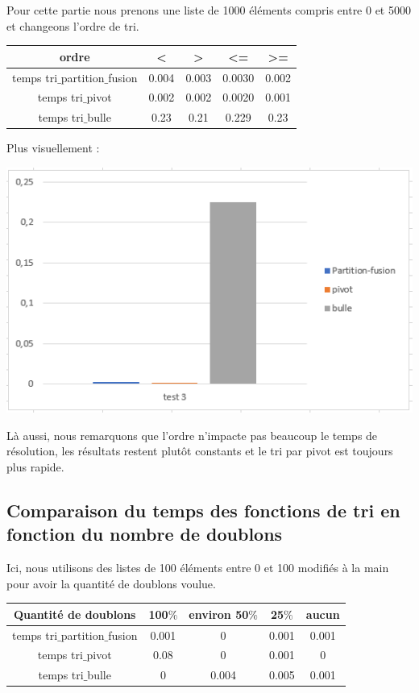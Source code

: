 \documentclass[a4paper, 12pt]{article}
\begin{document}
Pour cette partie nous prenons une liste de 1000 éléments compris entre 0 et 5000 et changeons l'ordre de tri. 
\begin{center}
\begin{tabular}{|c|c|c|c|c|}
\hline 
ordre & < & > & <= & >= \\ 
\hline 
temps tri$\_$partition$\_$fusion & 0.004 & 0.003 &0.0030 & 0.002 \\ 
\hline 
temps tri$\_$pivot & 0.002 & 0.002 & 0.0020 & 0.001\\ 
\hline 
temps tri$\_$bulle & 0.23 & 0.21 & 0.229 & 0.23 \\ 
\hline  
\end{tabular}
\end{center} 
\newpage

Plus visuellement : 
\begin{center}
\includegraphics[scale=1]{graphique/test3.PNG} 
\end{center}

Là aussi, nous remarquons que l'ordre n'impacte pas beaucoup le temps de résolution, les résultats restent plutôt constants et le tri par pivot est toujours plus rapide.  

\subsection{Comparaison du temps des fonctions de tri en fonction du nombre de doublons}

Ici, nous utilisons des listes de 100 éléments entre 0 et 100 modifiés à la main pour avoir la quantité de doublons voulue.
\begin{center}
\begin{tabular}{|c|c|c|c|c|}
\hline 
Quantité de doublons & 100$\%$ & environ 50$\%$ & 25$\%$ & aucun \\ 
\hline 
temps tri$\_$partition$\_$fusion & 0.001 & 0 &0.001 & 0.001 \\ 
\hline 
temps tri$\_$pivot & 0.08 & 0 & 0.001 & 0\\ 
\hline 
temps tri$\_$bulle & 0 & 0.004 & 0.005 & 0.001 \\ 
\hline  
\end{tabular}
\end{center}
\newpage
\end{document}
